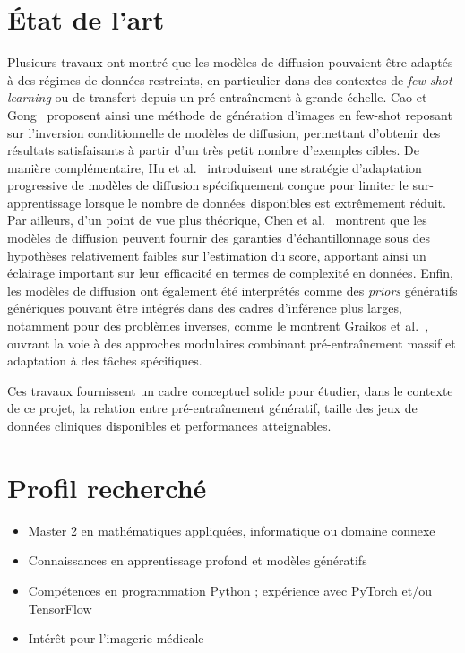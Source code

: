 \documentclass[11pt,a4paper]{article}
\begin{document}
\section*{État de l'art}
Plusieurs travaux ont montré que les modèles de diffusion pouvaient être 
adaptés à des régimes de données restreints, en
particulier dans des contextes de \emph{few-shot learning} ou de transfert
depuis un pré-entraînement à grande échelle. Cao et Gong~\cite{cao2024fewshot}
proposent ainsi une méthode de génération d'images en few-shot reposant sur
l'inversion conditionnelle de modèles de diffusion, permettant d'obtenir des
résultats satisfaisants à partir d'un très petit nombre d'exemples cibles. De
manière complémentaire, Hu et al.~\cite{hu2023phasic} introduisent une stratégie
d'adaptation progressive de modèles de diffusion spécifiquement conçue pour
limiter le sur-apprentissage lorsque le nombre de données disponibles est
extrêmement réduit. Par ailleurs, d'un point de vue plus théorique, Chen et
al.~\cite{chen2022sampling} montrent que les modèles de diffusion peuvent
fournir des garanties d'échantillonnage sous des hypothèses relativement faibles
sur l'estimation du score, apportant ainsi un éclairage important sur leur
efficacité en termes de complexité en données. Enfin, les modèles de diffusion
ont également été interprétés comme des \emph{priors} génératifs génériques
pouvant être intégrés dans des cadres d'inférence plus larges, notamment pour
des problèmes inverses, comme le montrent Graikos et
al.~\cite{graikos2022plugandplay}, ouvrant la voie à des approches modulaires
combinant pré-entraînement massif et adaptation à des tâches spécifiques.

Ces travaux fournissent un cadre conceptuel solide pour étudier, dans le
contexte de ce projet, la relation entre pré-entraînement génératif, taille des
jeux de données cliniques disponibles et performances atteignables.

\section*{Profil recherché}

\begin{itemize}
    \item Master 2 en mathématiques appliquées, informatique ou domaine connexe
    \item Connaissances en apprentissage profond et modèles génératifs
    \item Compétences en programmation Python ; expérience avec PyTorch et/ou TensorFlow
    \item Intérêt pour l'imagerie médicale
\end{itemize}
\end{document}
